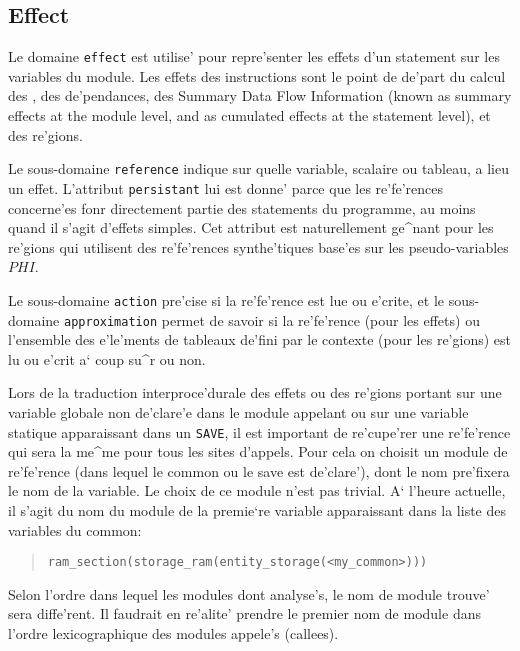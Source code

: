 {}

\subsection{Effect}
\label{subsection-effect}

{}

Le domaine \verb/effect/ est utilise' pour repre'senter les effets d'un
statement sur les variables du module. Les effets des instructions sont
le point de de'part du calcul des  , des
de'pendances, des Summary Data Flow Information (known as summary
effects at the module level, and as cumulated effects at the statement
level), et des re'gions.

Le sous-domaine {\tt reference} indique sur quelle variable, scalaire ou
tableau, a lieu un effet. L'attribut {\tt persistant} lui est donne'
parce que les re'fe'rences concerne'es fonr directement partie des
statements du programme, au moins quand il s'agit d'effets simples. Cet
attribut est naturellement ge^nant pour les re'gions qui utilisent des
re'fe'rences synthe'tiques base'es sur les pseudo-variables $PHI$.

Le sous-domaine {\tt action} pre'cise si la
re'fe'rence est lue ou e'crite, et le sous-domaine {\tt approximation}
permet de savoir si la re'fe'rence (pour les effets) ou l'ensemble des
e'le'ments de tableaux de'fini par le contexte (pour les re'gions) est lu ou
e'crit a` coup su^r ou non. 

Lors de la traduction interproce'durale des effets ou des re'gions portant
sur une variable globale non de'clare'e dans le module appelant ou sur une
variable statique apparaissant dans un {\tt SAVE}, il est important de
re'cupe'rer une re'fe'rence qui sera la me^me pour tous les sites d'appels.
Pour cela on choisit un module de re'fe'rence (dans lequel le common ou le
save est de'clare'), dont le nom pre'fixera le nom de la variable. Le choix
de ce module n'est pas trivial. A` l'heure actuelle, il s'agit du nom du
module de la premie`re variable apparaissant dans la liste des variables du
common:
\begin{quote}
 {\tt ram\_section(storage\_ram(entity\_storage(<my\_common>)))}
\end{quote}
Selon l'ordre dans lequel les modules dont analyse's, le nom de module
trouve' sera diffe'rent. Il faudrait en re'alite' prendre le premier nom
de module dans l'ordre lexicographique des modules appele's (callees).

